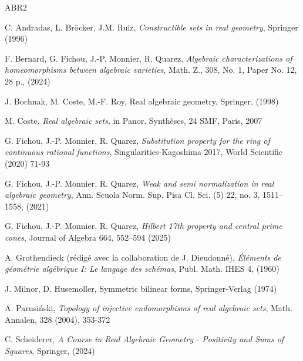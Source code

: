 \documentclass[12pt]{amsart}
\theoremstyle{definition}
\begin{document}
\begin{thebibliography}{ABR2} 



 C. Andradas, L. Br\"ocker, J.M. Ruiz, {\it Constructible sets in real geometry}, Springer (1996)
    



 F. Bernard, G. Fichou, J.-P. Monnier, R. Quarez, {\it Algebraic characterizations of homeomorphisms between algebraic varieties}, Math. Z., 308, No. 1, Paper No. 12, 28 p., (2024)



 J. Bochnak, M. Coste, M.-F. Roy, 
{Real algebraic
  geometry}, Springer, (1998)



 M. Coste, 
{\it Real algebraic sets}, in 
Panor. Synthèses, 24 SMF, Paris, 2007





 G. Fichou, J.-P. Monnier, R. Quarez, {\it Substitution property for the ring of continuous rational functions}, Singularities-Kagoshima 2017, World Scientific (2020) 71-93 



 G. Fichou, J.-P. Monnier, R. Quarez, {\it     Weak and semi normalization in real algebraic geometry},  Ann. Scuola Norm. Sup. Pisa Cl. Sci. (5) 22, no. 3, 1511--1558, (2021)
 
 G. Fichou, J.-P. Monnier, R. Quarez, {\it Hilbert 17th property and central prime cones}, Journal of Algebra 664, 552--594 (2025) 

 


 A. Grothendieck (rédigé avec la collaboration de J. Dieudonné), {\it \'Eléments de géométrie algébrique I: Le langage des schémas}, Publ. Math. IHES 4, (1960)



 J. Milnor, D. Husemoller, Symmetric bilinear forms, Springer-Verlag (1974)









 A. Parusi\'nski, {\it Topology of injective endomorphisms of real algebraic sets}, Math. Annalen, 328
(2004), 353-372



 C. Scheiderer, \textit{A Course in Real Algebraic Geometry - Positivity and Sums of Squares}, Springer, (2024) 





\end{thebibliography}
\end{document}
